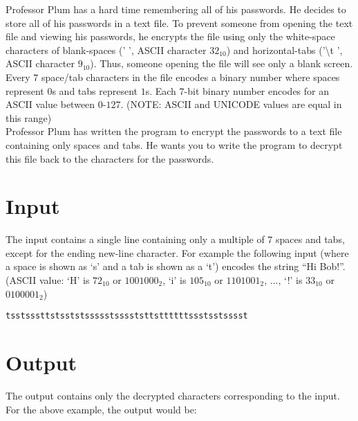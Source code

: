 
Professor Plum has a hard time remembering all of his passwords. He decides to store all of his passwords in a text file. To prevent someone from opening the text file and viewing his passwords, he encrypts the file using only the white-space characters of blank-spaces ('\,\,', ASCII character $32_{10}$) and horizontal-tabs ('\textbackslash t ', ASCII character $9_{10}$). Thus, someone opening the file will see only a blank screen. \\

Every $7$ space/tab characters in the file encodes a binary number where spaces represent $0$s and tabs represent $1$s. Each $7$-bit binary number encodes for an ASCII value between $0$-$127$. (NOTE: ASCII and UNICODE values are equal in this range) \\ 

Professor Plum has written the program to encrypt the passwords to a text file containing only spaces and tabs.  He wants you to write the program to decrypt this file back to the characters for the passwords.

\section*{Input}
The input contains a single line containing only a multiple of $7$ spaces and tabs, except for the ending new-line character. For example the following input (where a space is shown as ‘s’ and a tab is shown as a ‘t’) encodes the string “Hi Bob!”.  (ASCII value: ‘H’ is $72_{10}$ or $1001000_2$, ‘i’ is $105_{10}$ or $1101001_2$, ..., ‘!’ is $33_{10}$ or $0100001_2$) 
\begin{verbatim}
tsstsssttstsststssssstsssststtsttttttssstsstsssst
\end{verbatim}

\section*{Output}
The output contains only the decrypted characters corresponding to the input.  For the above example, the output would be:
